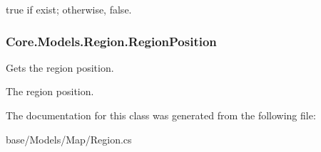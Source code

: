 {\ttfamily true} if exist; otherwise, {\ttfamily false}.\hypertarget{classCore_1_1Models_1_1Region_a2b370559aea0f72e9c2ee19dfcc7f7d8}{}
\subsubsection[{Region\+Position}]{ Core.\+Models.\+Region.\+Region\+Position\hspace{0.3cm}{\ttfamily [get]}}\label{classCore_1_1Models_1_1Region_a2b370559aea0f72e9c2ee19dfcc7f7d8}


Gets the region position. 

The region position.

The documentation for this class was generated from the following file\+:\begin{DoxyCompactItemize}
\item 
base/\+Models/\+Map/Region.\+cs\end{DoxyCompactItemize}
